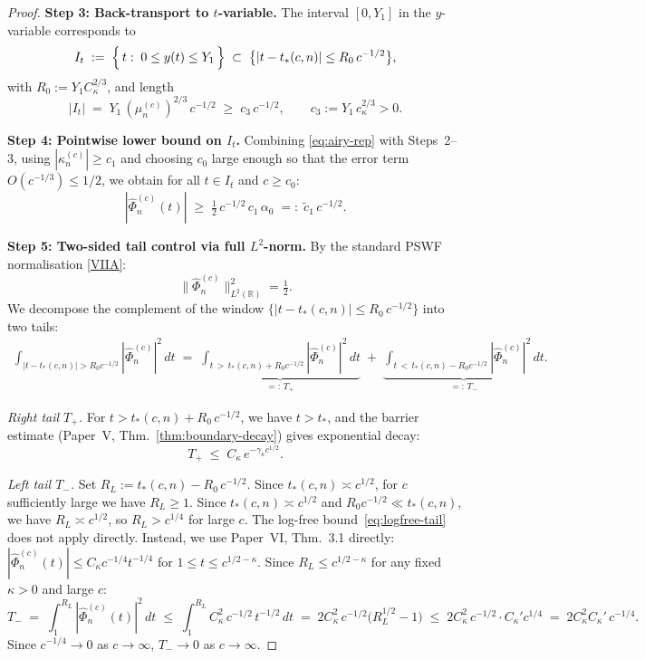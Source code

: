 \documentclass[12pt,a4paper]{amsart}
\theoremstyle{definition}
\theoremstyle{remark}
\newcommand{\Phihat}{\widehat{\Phi}}
\newcommand{\tstar}{t_*(c,n)}
\begin{document}
\begin{proof}
\textbf{Step 3: Back-transport to $t$-variable.}
The interval $[0, Y_1]$ in the $y$-variable corresponds to
\[
  I_t \;:=\;
  \Bigl\{\,t :\; 0 \le y(t) \le Y_1\,\Bigr\}
  \;\subset\;
  \bigl\{|t - \tstar| \le R_0\, c^{-1/2}\bigr\},
\]
with $R_0 := Y_1 C_\kappa^{2/3}$, and length
\[
  |I_t|
  \;=\;
  Y_1\,(\mu_n^{(c)})^{2/3}\,c^{-1/2}
  \;\ge\;
  c_3\,c^{-1/2},
  \qquad
  c_3 := Y_1\,c_\kappa^{2/3} > 0.
\]

\textbf{Step 4: Pointwise lower bound on $I_t$.}
Combining \eqref{eq:airy-rep} with Steps~2--3,
using $|\kappa_n^{(c)}| \ge c_1$ and choosing
$c_0$ large enough so that the error term
$O(c^{-1/3}) \le 1/2$,
we obtain for all $t \in I_t$ and $c \ge c_0$:
\[
  |\Phihat_n^{(c)}(t)|
  \;\ge\;
  \tfrac{1}{2}\,c^{-1/2}\,c_1\,\alpha_0
  \;=:\;
  \tilde{c}_1\,c^{-1/2}.
\]

\textbf{Step 5: Two-sided tail control via full $L^2$-norm.}
By the standard PSWF normalisation \eqref{VIIA}:
\[
  \|\Phihat_n^{(c)}\|_{L^2(\mathbb{R})}^2 = \tfrac{1}{2}.
\]
We decompose the complement of the window
$\{|t - \tstar| \le R_0\,c^{-1/2}\}$ into two tails:
\begin{align}
  \int_{|t-\tstar|>R_0 c^{-1/2}}
  |\Phihat_n^{(c)}|^2\,dt
  \;=\;
  \underbrace{
    \int_{t\,>\,\tstar + R_0 c^{-1/2}}
    |\Phihat_n^{(c)}|^2\,dt
  }_{\displaystyle =:\, T_+}
  \;+\;
  \underbrace{
    \int_{t\,<\,\tstar - R_0 c^{-1/2}}
    |\Phihat_n^{(c)}|^2\,dt
  }_{\displaystyle =:\, T_-}.
  \label{eq:two-tails}
\end{align}

\textit{Right tail $T_+$.}
For $t > \tstar + R_0\,c^{-1/2}$, we have $t > t_*$,
and the barrier estimate
(Paper~V, Thm.~\ref{thm:boundary-decay}) gives exponential decay:
\begin{equation}\label{eq:right-tail}
  T_+ \;\le\; C_\kappa\,e^{-\gamma_\kappa c^{1/2}}.
\end{equation}

\textit{Left tail $T_-$.}
Set $R_L := \tstar - R_0\,c^{-1/2}$.
Since $\tstar \asymp c^{1/2}$, for $c$ sufficiently large
we have $R_L \ge 1$.
Since $\tstar \asymp c^{1/2}$ and $R_0 c^{-1/2} \ll \tstar$,
we have $R_L \asymp c^{1/2}$, so $R_L > c^{1/4}$ for large $c$.
The log-free bound~\eqref{eq:logfree-tail} does not apply directly.
Instead, we use Paper~VI, Thm.~3.1 directly:
$|\Phihat_n^{(c)}(t)| \le C_\kappa c^{-1/4} t^{-1/4}$
for $1 \le t \le c^{1/2-\kappa}$. Since $R_L \le c^{1/2-\kappa}$
for any fixed $\kappa > 0$ and large $c$:
\begin{equation}\label{eq:left-tail}
  T_- \;=\;
  \int_1^{R_L} |\Phihat_n^{(c)}(t)|^2\,dt
  \;\le\;
  \int_1^{R_L} C_\kappa^2\,c^{-1/2}\,t^{-1/2}\,dt
  \;=\;
  2C_\kappa^2\,c^{-1/2}\bigl(R_L^{1/2} - 1\bigr)
  \;\le\;
  2C_\kappa^2\,c^{-1/2}\cdot C_\kappa' c^{1/4}
  \;=\;
  2C_\kappa^2 C_\kappa'\,c^{-1/4}.
\end{equation}
Since $c^{-1/4} \to 0$ as $c \to \infty$,
$T_- \to 0$ as $c \to \infty$.


\end{proof}
\end{document}
